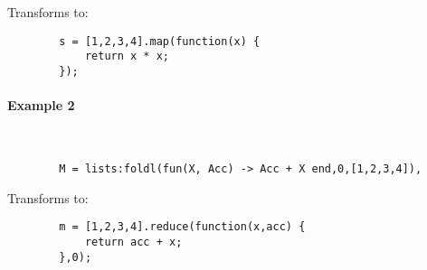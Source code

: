 Transforms to:

\begin{lstlisting}
        s = [1,2,3,4].map(function(x) {
            return x * x;
        });
\end{lstlisting}

\paragraph{\bf Example 2}\ 

\vspace{1\baselineskip}
\begin{lstlisting}
        M = lists:foldl(fun(X, Acc) -> Acc + X end,0,[1,2,3,4]),
\end{lstlisting}

Transforms to:

\begin{lstlisting}
        m = [1,2,3,4].reduce(function(x,acc) {
            return acc + x;
        },0);
\end{lstlisting}
